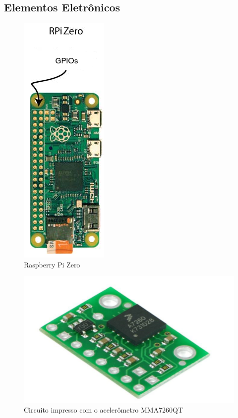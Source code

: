 \subsection{Elementos Eletrônicos}

\begin{figure}[H]
  \caption{Raspberry Pi Zero}
  \begin{center}
      \includegraphics[scale=.55]{img/rasp_zero}
  \end{center}
  \label{fig:rasp_zero}
\end{figure}


\begin{figure}[H]
  \caption{Circuito impresso com o acelerômetro MMA7260QT}
  \begin{center}
      \includegraphics[scale=.45]{img/pci_acelerometro_calache_p22}
  \end{center}
  \label{fig:pci_acelerometro_calache_p22}
\end{figure}
